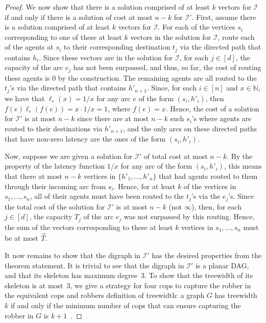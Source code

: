 \documentclass[letterpaper]{article} %
\begin{document}
\begin{proof}
We now show that there is a solution comprised of at least $k$ vectors for $\mathcal{I}$ if and only if there is a solution of cost at most $n-k$ for $\mathcal{I}'$.
First, assume there is a solution comprised of at least $k$ vectors for $\mathcal{I}$.
For each of the vertices $s_i$ corresponding to one of these at least $k$ vectors in the solution for $\mathcal{I}$, route each of the agents at $s_i$ to their corresponding destination $t_j$ via the directed path that contains $h_i$.
Since these vectors are in the solution for $\mathcal{I}$, for each $j\in [d]$, the capacity of the arc $e_j$ has not been surpassed, and thus, so far, the cost of routing these agents is $0$ by the construction.
The remaining agents are all routed to the $t_j$'s via the directed path that contains $h'_{n+1}$. 
Since, for each $i\in [n]$ and $x\in \mathbb{N}$, we have that $\ell_e(x) = 1/x$ for any arc $e$ of the form $(s_i,h'_i)$, then $f(e) \ell_e(f(e)) = x \cdot 1/x = 1$, where $f(e) = x$.
Hence, the cost of a solution for $\mathcal{I}'$ is at most $n-k$ since there are at most $n-k$ such $s_i$'s where agents are routed to their destinations via $h'_{n+1}$, and the only arcs on these directed paths that have non-zero latency are the ones of the form $(s_i,h'_i)$.

Now, suppose we are given a solution for $\mathcal{I}'$ of total cost at most $n-k$.
By the property of the latency function $1/x$ for any arc of the form $(s_i,h'_i)$, this means that there at most $n-k$ vertices in $\{h'_1,\ldots,h'_n\}$ that had agents routed to them through their incoming arc from $s_i$.
Hence, for at least $k$ of the vertices in $s_1,\ldots,s_n$, all of their agents must have been routed to the $t_j$'s via the $e_j$'s.
Since the total cost of the solution for $\mathcal{I}'$ is at most $n-k$ (not $\infty$), then, for each $j\in [d]$, the capacity $T_j$ of the arc $e_j$ was not surpassed by this routing.
Hence, the sum of the vectors corresponding to these at least $k$ vertices in $s_1,\ldots,s_n$ must be at most $\vec T$.

It now remains to show that the digraph in $\mathcal{I}'$ has the desired properties from the theorem statement. 
It is trivial to see that the digraph in $\mathcal{I}'$ is a planar DAG, and that its skeleton has maximum degree~$3$.
To show that the treewidth of its skeleton is at most~$3$, we give a strategy for four cops to capture the robber in the equivalent cops and robbers definition of treewidth: a graph $G$ has treewidth $k$ if and only if the minimum number of cops that can ensure capturing the robber in $G$ is $k+1$~\cite{SeymourT93}.


\end{proof}
\end{document}
